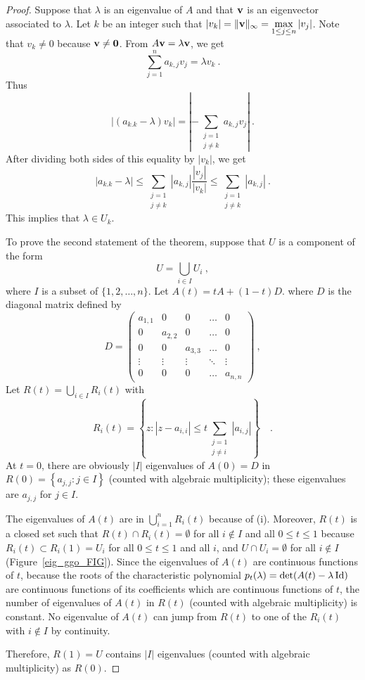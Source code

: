 \begin{proof}
 Suppose that $\lambda$ is an eigenvalue of $A$ and that $\mathbf{v}$ is
an eigenvector associated to $\lambda$.  Let $k$ be an integer such that
$\displaystyle |v_k| = \|\mathbf{v}\|_\infty = \max_{1\leq j\leq n} |v_j|$.
Note that $v_k \neq 0$ because $\mathbf{v} \neq \mathbf{0}$.  From
$A\mathbf{v} = \lambda \mathbf{v}$, we get
\[
\sum_{j=1}^n a_{k,j} v_j = \lambda v_k \ .
\]
Thus
\[
\left| (a_{k.k} - \lambda ) v_k \right|
= \left| - \sum_{\substack{j=1\\ j\neq k}} a_{k,j} v_j \right| \  .
\]
After dividing both sides of this equality by $|v_k|$, we get
\[
\left| a_{k.k} - \lambda \right|
\leq \sum_{\substack{j=1\\ j\neq k}} \left|a_{k,j} \right|
\frac{|v_j|}{|v_k|} \leq \sum_{\substack{j=1\\ j\neq k}} \left|a_{k,j} \right| \ .
\]
This implies that $\lambda \in U_k$.

 To prove the second statement of the theorem, suppose that $U$ is a
component of the form
\[
U = \bigcup_{i\in I} U_i \  ,
\]
where $I$ is a subset of $\{1,2,\ldots,n\}$.  Let
$A(t) = tA + (1-t)D$. where $D$ is the diagonal matrix defined by
\[
D =
\begin{pmatrix}
a_{1,1} & 0 & 0 & \ldots & 0 \\
0 & a_{2,2} & 0 & \ldots & 0 \\
0 & 0 & a_{3,3} & \ldots & 0 \\
\vdots & \vdots & \vdots & \ddots & \vdots \\
0 & 0 & 0 & \ldots & a_{n,n} 
\end{pmatrix} \ ,
\]
Let $\displaystyle R(t) = \bigcup_{i\in I} R_i(t)$ with
\[
R_i(t) = \left\{ z : |z-a_{i,i}| \leq t \sum_{\substack{j=1\\ j\neq i}}
| a_{i,j} | \right\} \quad .
\]
At $t=0$, there are obviously $|I|$ eigenvalues of $A(0) = D$ in
$\displaystyle R(0) = \left\{ a_{j,j} : j \in I \right\}$
(counted with algebraic multiplicity); these eigenvalues are $a_{j,j}$ for
$j\in I$.

The eigenvalues of $A(t)$ are in $\displaystyle \bigcup_{i=1}^n R_i(t)$
because of (i). Moreover, $R(t)$ is a closed set such that
$R(t) \cap R_i(t) = \emptyset$ for all $i\not\in I$ and all
$0\leq t \leq 1$ because $ R_i(t) \subset R_i(1) = U_i$ for all
$0\leq t \leq 1$ and all $i$, and $U \cap U_i = \emptyset$ for all
$i\not\in I$ (Figure~\ref{eig_ggo_FIG}).
Since the eigenvalues of $A(t)$ are continuous functions of $t$, because the
roots of the characteristic polynomial
$p_t(\lambda) = \det(A(t) - \lambda \operatorname{Id})$
are continuous functions of its coefficients which are continuous functions
of $t$, the number of eigenvalues of $A(t)$ in $R(t)$ (counted with
algebraic multiplicity) is constant.  No eigenvalue of $A(t)$ can jump from
$R(t)$ to one of the $R_i(t)$ with $i\not\in I$ by continuity.

Therefore, $R(1)=U$ contains $|I|$ eigenvalues (counted with algebraic
multiplicity) as $R(0)$.
\end{proof}

